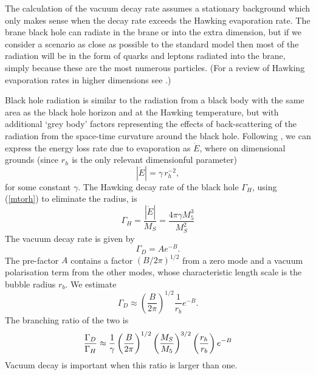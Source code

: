 \documentclass[aps,12pt,prd,superscriptaddress,preprintnumbers, 
	amssymb,
	amsmath,
	notitlepage,
	longbibliography,
	nofootinbib]{revtex4-1}
\begin{document}
The calculation of the vacuum decay rate assumes a stationary background
which only makes sense when the decay rate exceeds the Hawking evaporation rate.
The brane black hole can radiate in the brane or into the extra dimension, but
if we consider a scenario as close as possible to the standard model then most
of the radiation will be in the form of quarks and leptons radiated into the brane,
simply because these are the most numerous particles. (For a review of Hawking 
evaporation rates in higher dimensions see \cite{Kanti:2014vsa}.)

Black hole radiation is similar to the radiation from a black body with the same area
as the black hole horizon and at the Hawking temperature,
but with additional `grey body' factors representing the effects of back-scattering of
the radiation from the space-time curvature around the black hole.
Following \cite{Kanti:2014vsa}, we can express the energy loss rate due to evaporation 
as $\dot E$, where on dimensional grounds (since $r_h$ is the only relevant dimensionful
parameter)
\begin{equation}
|\dot E|=\gamma \,r_h^{-2},
\end{equation}
for some constant $\gamma$. The Hawking decay rate of the black hole $\Gamma_H$, using
(\ref{mtorh}) to eliminate the radius, is
\begin{equation}
\Gamma_H=\frac{|\dot E|}{M_S}=\frac{4\pi\gamma M_5^3}{M_S^2}
\end{equation}
The vacuum decay rate is given by
\begin{equation}
\Gamma_D=Ae^{-B}.
\end{equation}
The pre-factor $A$ contains a factor $(B/2\pi)^{1/2}$ from a zero mode 
and a vacuum polarisation term from the other modes, whose characteristic 
length scale is the bubble radius $r_b$. We estimate
\begin{equation}
\Gamma_D\approx\left(\frac{B}{2\pi}\right)^{1/2}\frac{1}{r_b}e^{-B}.
\end{equation}
The branching ratio of the two is
\begin{equation}
{\Gamma_D\over\Gamma_H}\approx{1\over\gamma}\left(\frac{B}{2\pi}\right)^{1/2}
\left(\frac{M_S}{M_5}\right)^{3/2}\left(\frac{r_h}{r_b}\right)e^{-B}
\end{equation}
Vacuum decay is important when this ratio is larger than one.
\end{document}
